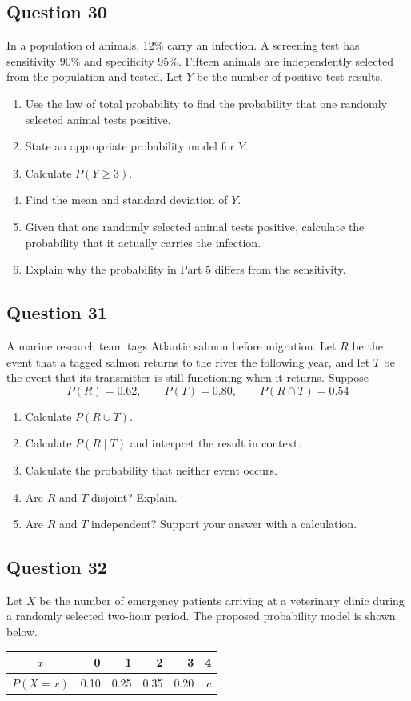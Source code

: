 \documentclass[10pt,letterpaper]{article}
\newcommand{\questionheading}[1]{%
  \subsection*{Question #1}
}
\begin{document}
\questionheading{30}
In a population of animals, 12\% carry an infection. A screening test has sensitivity 90\% and specificity 95\%. Fifteen animals are independently selected from the population and tested. Let $Y$ be the number of positive test results.
\begin{enumerate}
	\item Use the law of total probability to find the probability that one randomly selected animal tests positive.
	\item State an appropriate probability model for $Y$.
	\item Calculate $P(Y\geq3)$.
	\item Find the mean and standard deviation of $Y$.
	\item Given that one randomly selected animal tests positive, calculate the probability that it actually carries the infection.
	\item Explain why the probability in Part 5 differs from the sensitivity.
\end{enumerate}

\questionheading{31}
A marine research team tags Atlantic salmon before migration. Let $R$ be the event that a tagged salmon returns to the river the following year, and let $T$ be the event that its transmitter is still functioning when it returns. Suppose
\[
	P(R)=0.62, \qquad P(T)=0.80, \qquad P(R\cap T)=0.54
\]
\begin{enumerate}
	\item Calculate $P(R\cup T)$.
	\item Calculate $P(R\mid T)$ and interpret the result in context.
	\item Calculate the probability that neither event occurs.
	\item Are $R$ and $T$ disjoint? Explain.
	\item Are $R$ and $T$ independent? Support your answer with a calculation.
\end{enumerate}

\questionheading{32}
Let $X$ be the number of emergency patients arriving at a veterinary clinic during a randomly selected two-hour period. The proposed probability model is shown below.

\begin{center}
\begin{tabular}{c*{5}{r}}
\toprule
$x$ & 0 & 1 & 2 & 3 & 4 \\
\midrule
$P(X=x)$ & 0.10 & 0.25 & 0.35 & 0.20 & $c$ \\
\bottomrule
\end{tabular}
\end{center}
\end{document}
